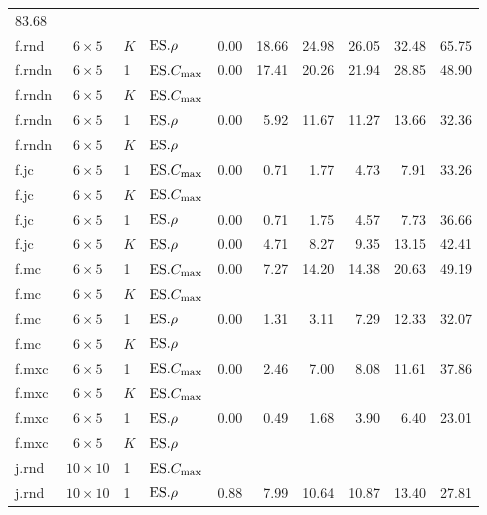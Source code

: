 \begin{table}[b]
{\begin{tabular}{lcllrrrrrr}
83.68 \\ 
f.rnd & $6\times5$ & $K$ & $\text{ES}.{\rho}$ & 0.00 & 18.66 & 24.98 & 26.05 & 32.48 & 
65.75 \\ 
\midrule
f.rndn & $6\times5$ & 1 & $\text{ES}.{C_{\max}}$ & 0.00 & 17.41 & 20.26 & 21.94 & 28.85 & 
48.90 \\ 
f.rndn & $6\times5$ & $K$ & $\text{ES}.{C_{\max}}$ & & & & & & \\
f.rndn & $6\times5$ & 1 & $\text{ES}.{\rho}$ & 0.00 & 5.92 & 11.67 & 11.27 & 13.66 & 
32.36 \\ 
f.rndn & $6\times5$ & $K$ & $\text{ES}.{\rho}$ & & & & & & \\
\midrule
f.jc & $6\times5$ & 1 & $\text{ES}.{C_{\max}}$ & 0.00 & 0.71 & 1.77 & 4.73 & 7.91 & 33.26 
\\ 
f.jc & $6\times5$ & $K$ & $\text{ES}.{C_{\max}}$ & & & & & & \\
f.jc & $6\times5$ & 1 & $\text{ES}.{\rho}$ & 0.00 & 0.71 & 1.75 & 4.57 & 7.73 & 36.66 \\ 
f.jc & $6\times5$ & $K$ & $\text{ES}.{\rho}$ & 0.00 & 4.71 & 8.27 & 9.35 & 13.15 & 42.41 
\\ 
\midrule
f.mc & $6\times5$ & 1 & $\text{ES}.{C_{\max}}$ & 0.00 & 7.27 & 14.20 & 14.38 & 20.63 & 
49.19 \\ 
f.mc & $6\times5$ & $K$ & $\text{ES}.{C_{\max}}$ & & & & & & \\
f.mc & $6\times5$ & 1 & $\text{ES}.{\rho}$ & 0.00 & 1.31 & 3.11 & 7.29 & 12.33 & 32.07 
\\ 
f.mc & $6\times5$ & $K$ & $\text{ES}.{\rho}$ & & & & & & \\
\midrule
f.mxc & $6\times5$ & 1 & $\text{ES}.{C_{\max}}$ & 0.00 & 2.46 & 7.00 & 8.08 & 11.61 & 37.86 
\\ 
f.mxc & $6\times5$ & $K$ & $\text{ES}.{C_{\max}}$ & & & & & & \\
f.mxc & $6\times5$ & 1 & $\text{ES}.{\rho}$ & 0.00 & 0.49 & 1.68 & 3.90 & 6.40 & 23.01 
\\ 
f.mxc & $6\times5$ & $K$ & $\text{ES}.{\rho}$ & & & & & & \\
\midrule
j.rnd & $10\times10$ & 1 & $\text{ES}.{C_{\max}}$ & & & & & & \\
j.rnd & $10\times10$ & 1 & $\text{ES}.{\rho}$ & 0.88 & 7.99 & 10.64 & 10.87 & 13.40 & 
27.81 \\ 
\bottomrule
\end{tabular}}
\end{table}


